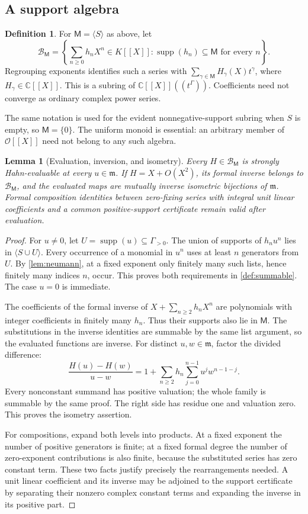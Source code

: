\documentclass[11pt,letterpaper]{article}
\numberwithin{equation}{section}
\theoremstyle{plain}
\newtheorem{lemma}[theorem]{Lemma}
\theoremstyle{definition}
\newtheorem{definition}[theorem]{Definition}
\theoremstyle{remark}
\newcommand{\C}{\mathbb C}
\newcommand{\OO}{\mathcal O}
\newcommand{\mm}{\mathfrak m}
\newcommand{\supp}{\operatorname{supp}}
\newcommand{\M}{\mathsf M}
\newcommand{\HS}{\mathscr B}
\begin{document}
\subsection{A support algebra}

\begin{definition}\label{def:BM}
For $\M=\langle S\rangle$ as above, let
\[
 \HS_{\M}=
 \left\{\sum_{n\ge0}h_nX^n\in K[[X]]:
           \supp(h_n)\subseteq\M\text{ for every }n\right\}.
\]
Regrouping exponents identifies such a series with
$\sum_{\gamma\in\M}H_\gamma(X)t^\gamma$, where
$H_\gamma\in\C[[X]]$. This is a subring of
$\C[[X]]((t^\Gamma))$. Coefficients need not converge as ordinary complex
power series.
\end{definition}

The same notation is used for the evident nonnegative-support subring when
$S$ is empty, so $\M=\{0\}$. The uniform monoid is essential: an arbitrary
member of $\OO[[X]]$ need not belong to any such algebra.

\begin{lemma}[Evaluation, inversion, and isometry]\label{lem:evaluation}
Every $H\in\HS_\M$ is strongly Hahn-evaluable at every $u\in\mm$.
If $H=X+O(X^2)$, its formal inverse belongs to $\HS_\M$, and the evaluated
maps are mutually inverse isometric bijections of $\mm$. Formal composition
identities between zero-fixing series with integral unit linear coefficients
and a common positive-support certificate remain valid after evaluation.
\end{lemma}

\begin{proof}
For $u\ne0$, let $U=\supp(u)\subseteq\Gamma_{>0}$. The union of supports of
$h_nu^n$ lies in $\langle S\cup U\rangle$. Every occurrence of a monomial in
$u^n$ uses at least $n$ generators from $U$. By \cref{lem:neumann}, at a
fixed exponent only finitely many such lists, hence finitely many indices
$n$, occur. This proves both requirements in \cref{def:summable}.
The case $u=0$ is immediate.

The coefficients of the formal inverse of $X+\sum_{n\ge2}h_nX^n$ are
polynomials with integer coefficients in finitely many $h_n$. Thus their
supports also lie in $\M$. The substitutions in the inverse identities are
summable by the same list argument, so the evaluated functions are inverse.
For distinct $u,w\in\mm$, factor the divided difference:
\[
 \frac{H(u)-H(w)}{u-w}
 =1+\sum_{n\ge2}h_n\sum_{j=0}^{n-1}u^jw^{n-1-j}.
\]
Every nonconstant summand has positive valuation; the whole family is
summable by the same proof. The right side has residue one and valuation
zero. This proves the isometry assertion.

For compositions, expand both levels into products. At a fixed exponent the
number of positive generators is finite; at a fixed formal degree the number
of zero-exponent contributions is also finite, because the substituted
series has zero constant term. These two facts justify precisely the
rearrangements needed. A unit linear coefficient and its inverse may be
adjoined to the support certificate by separating their nonzero complex
constant terms and expanding the inverse in its positive part.
\end{proof}
\end{document}
